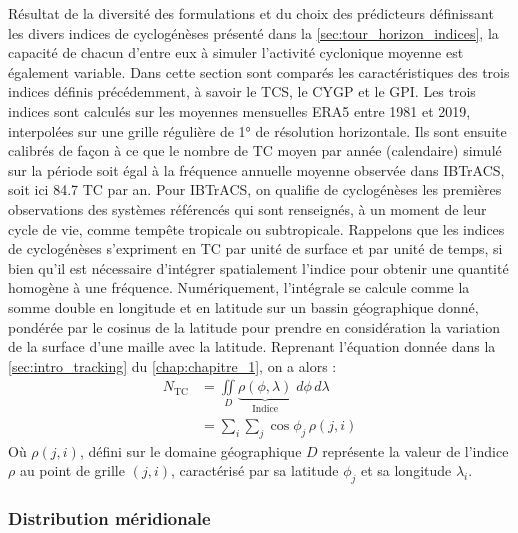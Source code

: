 \documentclass[../main.tex]{subfiles}
\begin{document}
Résultat de la diversité des formulations et du choix des prédicteurs définissant les divers indices de cyclogénèses présenté dans la
\cref{sec:tour_horizon_indices}, la capacité de chacun d'entre eux à simuler l'activité cyclonique moyenne est également variable. Dans cette section sont
comparés les caractéristiques des trois indices définis précédemment, à savoir le TCS, le CYGP et le GPI. Les trois indices sont calculés sur les moyennes
mensuelles ERA5 entre \num{1981} et \num{2019}, interpolées sur une grille régulière de \ang{1} de résolution horizontale. Ils sont ensuite calibrés de façon à
ce que le nombre de TC moyen par année (calendaire) simulé sur la période soit égal à la fréquence annuelle moyenne observée dans IBTrACS, soit ici \num{84.7}
TC par an. Pour IBTrACS, on qualifie de cyclogénèses les premières observations des systèmes référencés qui sont renseignés, à un moment de leur cycle de vie,
comme tempête tropicale ou subtropicale. Rappelons que les indices de cyclogénèses s'expriment en TC par unité de surface et par unité de temps, si bien qu'il
est nécessaire d'intégrer spatialement l'indice pour obtenir une quantité homogène à une fréquence. Numériquement, l'intégrale se calcule comme la somme double
en longitude et en latitude sur un bassin géographique donné, pondérée par le cosinus de la latitude pour prendre en considération la variation de la surface
d'une maille avec la latitude. Reprenant l'équation donnée dans la \cref{sec:intro_tracking} du \cref{chap:chapitre_1}, on a alors :
%
\begin{align*}
    N_{\mathrm{TC}} &= \iint\limits_{D} \underbrace{\rho(\phi, \lambda)}_{\text{Indice}} \; d\phi \, d\lambda \\
                    &= \sum_{i} \sum_{j} \cos \phi_j \, \rho (j, i) 
\end{align*}
%
Où $\rho(j,i)$, défini sur le domaine géographique $D$ représente la valeur de l'indice $\rho$ au point de grille $(j,i)$, caractérisé par sa latitude $\phi_j$
et sa longitude $\lambda_i$.

\subsubsection*{Distribution méridionale}
\end{document}
